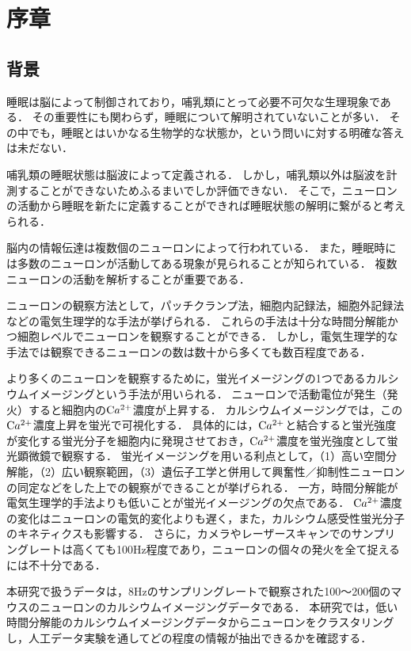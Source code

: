 \chapter{序章}
\section{背景}
睡眠は脳によって制御されており\cite{Hobson2005}，哺乳類にとって必要不可欠な生理現象である．
その重要性にも関わらず，睡眠について解明されていないことが多い．
その中でも，睡眠とはいかなる生物学的な状態か，という問いに対する明確な答えは未だない\cite{Kanda2016}．

哺乳類の睡眠状態は脳波によって定義される．
しかし，哺乳類以外は脳波を計測することができないためふるまいでしか評価できない．
そこで，ニューロンの活動から睡眠を新たに定義することができれば睡眠状態の解明に繋がると考えられる\cite{Kanda2020}．

脳内の情報伝達は複数個のニューロンによって行われている．
また，睡眠時には多数のニューロンが活動してある現象が見られることが知られている．
複数ニューロンの活動を解析することが重要である．

ニューロンの観察方法として，パッチクランプ法，細胞内記録法，細胞外記録法などの電気生理学的な手法が挙げられる．
これらの手法は十分な時間分解能かつ細胞レベルでニューロンを観察することができる．
しかし，電気生理学的な手法では観察できるニューロンの数は数十から多くても数百程度である．

より多くのニューロンを観察するために，蛍光イメージングの1つであるカルシウムイメージングという手法が用いられる．
ニューロンで活動電位が発生（発火）すると細胞内の$\text Ca^{2+}$濃度が上昇する．
カルシウムイメージングでは，この$\text Ca^{2+}$濃度上昇を蛍光で可視化する．
具体的には，$\text Ca^{2+}$と結合すると蛍光強度が変化する蛍光分子を細胞内に発現させておき，$\text Ca^{2+}$濃度を蛍光強度として蛍光顕微鏡で観察する．
蛍光イメージングを用いる利点として，（1）高い空間分解能，（2）広い観察範囲，（3）遺伝子工学と併用して興奮性／抑制性ニューロンの同定などをした上での観察ができることが挙げられる．
一方，時間分解能が電気生理学的手法よりも低いことが蛍光イメージングの欠点である．
$\text Ca^{2+}$濃度の変化はニューロンの電気的変化よりも遅く，また，カルシウム感受性蛍光分子のキネティクスも影響する．
さらに，カメラやレーザースキャンでのサンプリングレートは高くても100Hz程度であり，ニューロンの個々の発火を全て捉えるには不十分である．

本研究で扱うデータは，8Hzのサンプリングレートで観察された100〜200個のマウスのニューロンのカルシウムイメージングデータである．
本研究では，低い時間分解能のカルシウムイメージングデータからニューロンをクラスタリングし，人工データ実験を通してどの程度の情報が抽出できるかを確認する．
